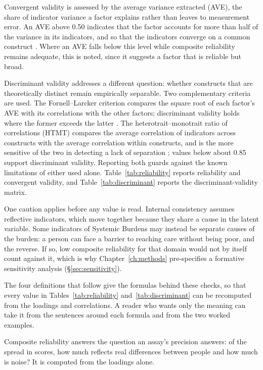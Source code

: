 Convergent validity is assessed by the average variance extracted (AVE), the share of indicator variance a factor explains rather than leaves to measurement error. An AVE above 0.50 indicates that the factor accounts for more than half of the variance in its indicators, and so that the indicators converge on a common construct \citep{fornell_1981}. Where an AVE falls below this level while composite reliability remains adequate, this is noted, since it suggests a factor that is reliable but broad.

Discriminant validity addresses a different question: whether constructs that are theoretically distinct remain empirically separable. Two complementary criteria are used. The Fornell--Larcker criterion compares the square root of each factor's AVE with its correlations with the other factors; discriminant validity holds where the former exceeds the latter \citep{fornell_1981}. The heterotrait--monotrait ratio of correlations (HTMT) compares the average correlation of indicators across constructs with the average correlation within constructs, and is the more sensitive of the two in detecting a lack of separation \citep{henseler_2015}; values below about 0.85 support discriminant validity. Reporting both guards against the known limitations of either used alone. Table~\ref{tab:reliability} reports reliability and convergent validity, and Table~\ref{tab:discriminant} reports the discriminant-validity matrix.

One caution applies before any value is read. Internal consistency assumes reflective indicators, which move together because they share a cause in the latent variable. Some indicators of Systemic Burdens may instead be separate causes of the burden: a person can face a barrier to reaching care without being poor, and the reverse. If so, low composite reliability for that domain would not by itself count against it, which is why Chapter~\ref{ch:methods} pre-specifies a formative sensitivity analysis (\S\ref{sec:sensitivity}).

The four definitions that follow give the formulas behind these checks, so that every value in Tables~\ref{tab:reliability} and~\ref{tab:discriminant} can be recomputed from the loadings and correlations. A reader who wants only the meaning can take it from the sentences around each formula and from the two worked examples.

Composite reliability answers the question an assay's precision answers: of the spread in scores, how much reflects real differences between people and how much is noise? It is computed from the loadings alone.

